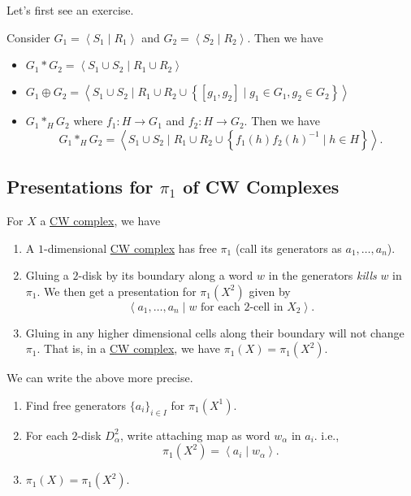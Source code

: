 Let's first see an exercise.
\begin{exercise}
	Consider \(G_1 = \left< S_1 \mid R_1 \right> \) and \(G_2 = \left< S_2 \mid R_2 \right> \). Then we have
	\begin{itemize}
		\item \(G_1\ast G_2 = \left< S_{1}\cup S_2  \mid R_1 \cup R_2 \right> \)
		\item \(G_1\oplus G_2 = \left< S_1 \cup S_2  \mid R_1 \cup R_2\cup \left\{[g_1, g_2] \mid g_1\in G_1, g_2\in G_2\right\} \right> \)
		\item \(G_1 \ast_H G_2 \) where \(f_1\colon H\to G_1\) and \(f_2\colon H\to G_2\). Then we have
		      \[
			      G_1\ast_H G_2 = \left< S_1 \cup S_2  \mid R_1 \cup  R_2\cup \left\{f_1(h)f_2(h)^{-1}  \mid h\in H\right\} \right>.
		      \]
	\end{itemize}
\end{exercise}

\subsection{Presentations for \(\pi _1\) of CW Complexes}
For \(X\) a \hyperref[def:CW-Complex]{CW complex}, we have
\begin{enumerate}
	\item A \(1\)-dimensional \hyperref[def:CW-Complex]{CW complex} has free \(\pi _1\) (call its generators as \(a_1, \ldots , a_n \)).
	\item Gluing a \(2\)-disk by its boundary along a word \(w\) in the generators \emph{kills} \(w\) in \(\pi _1\). We then get a presentation for \(\pi _1(X^2)\)
	      given by
	      \[
		      \left< a_1, \ldots , a_n \mid w \text{ for each \(2\)-cell in \(X_2\)}\right>.
	      \]
	\item Gluing in any higher dimensional cells along their boundary will not change \(\pi _1\). That is, in a \hyperref[def:CW-Complex]{CW complex},
	      we have \(\pi _1(X) = \pi _1(X^2)\).
\end{enumerate}

\begin{remark}
	We can write the above more precise.
	\begin{enumerate}
		\item Find free generators \(\{a _i\}_{i\in I}\) for \(\pi _1(X^1)\).
		\item For each \(2\)-disk \(D^2_\alpha \), write attaching map as word \(w_\alpha \) in \(a_{i}\). i.e.,
		      \[
			      \pi _1(X^2) = \left< a_{i} \mid w_\alpha  \right>.
		      \]
		\item \(\pi_1(X) = \pi _1(X^2)\).
	\end{enumerate}
\end{remark}

